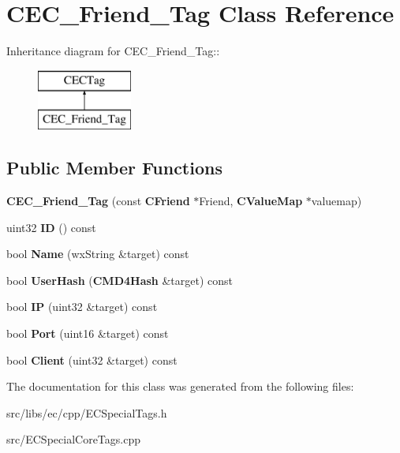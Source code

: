 \section{CEC\_\-Friend\_\-Tag Class Reference}
\label{classCEC__Friend__Tag}
Inheritance diagram for CEC\_\-Friend\_\-Tag::\begin{figure}[H]
\begin{center}
\leavevmode
\includegraphics[height=2cm]{classCEC__Friend__Tag}
\end{center}
\end{figure}
\subsection*{Public Member Functions}
\begin{DoxyCompactItemize}
\item 
{\bfseries CEC\_\-Friend\_\-Tag} (const {\bf CFriend} $\ast$Friend, {\bf CValueMap} $\ast$valuemap)\label{classCEC__Friend__Tag_a39c2b6476fe990d8dfa94801938dc04c}

\item 
uint32 {\bfseries ID} () const \label{classCEC__Friend__Tag_ac1565cb7eaf5445a4e8c5a7c178e7d4c}

\item 
bool {\bfseries Name} (wxString \&target) const \label{classCEC__Friend__Tag_a5174114c2d4fe0e5acb6a236cd67765b}

\item 
bool {\bfseries UserHash} ({\bf CMD4Hash} \&target) const \label{classCEC__Friend__Tag_a59183c92842d6b3b39084ed4e2d471d7}

\item 
bool {\bfseries IP} (uint32 \&target) const \label{classCEC__Friend__Tag_ac561d65b0b7719fb0be5a2bebd604cee}

\item 
bool {\bfseries Port} (uint16 \&target) const \label{classCEC__Friend__Tag_a306fe125b11301f6d6b022489a67ad8b}

\item 
bool {\bfseries Client} (uint32 \&target) const \label{classCEC__Friend__Tag_aafab2de5be3f0d5e56c997cb621992cd}

\end{DoxyCompactItemize}


The documentation for this class was generated from the following files:\begin{DoxyCompactItemize}
\item 
src/libs/ec/cpp/ECSpecialTags.h\item 
src/ECSpecialCoreTags.cpp\end{DoxyCompactItemize}
